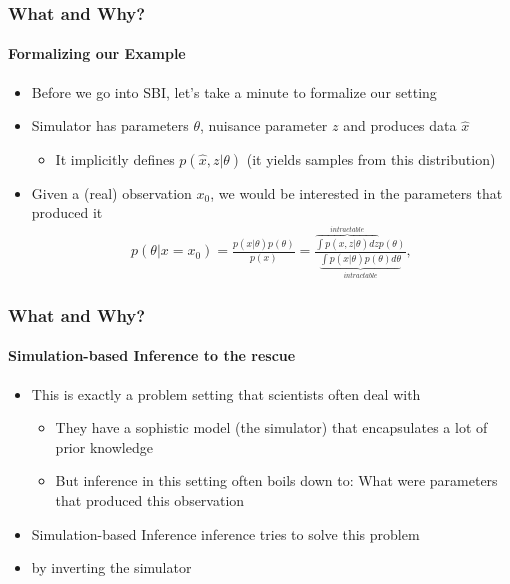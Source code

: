 \documentclass[9pt]{beamer}
\begin{document}
\begin{frame}
\frametitle{What and Why?}
\framesubtitle{Formalizing our Example}
\begin{itemize}
	\item Before we go into SBI, let's take a minute to formalize our setting
	\item Simulator has parameters $\theta$, nuisance parameter $z$ and produces data $\hat{x}$
	\begin{itemize}
		\item It implicitly defines $p(\hat{x},z|\theta)$ (it yields samples from this distribution)
	\end{itemize}
	\item Given a (real) observation $x_0$, we would be interested in the parameters that produced it
	\begin{align}
	p(\theta|x=x_0) = \frac{p(x|\theta)p(\theta)}{p(x)} = \frac{\overbrace{\int p(x,z|\theta)dz}^{intractable} p(\theta)}{\underbrace{\int p(x|\theta)p(\theta)d\theta}_{intractable}},
	\end{align}
\end{itemize}
\end{frame} 



\begin{frame}
\frametitle{What and Why?}
\framesubtitle{Simulation-based Inference to the rescue}
\begin{itemize}
		\item This is exactly a problem setting that scientists often deal with
	\begin{itemize}
		\item They have a sophistic model (the simulator) that encapsulates a lot of prior knowledge
		\item But inference in this setting often boils down to: What were parameters that produced this observation
	\end{itemize}
	\item Simulation-based Inference inference tries to solve this problem
	\item by inverting the simulator
\end{itemize}
\end{frame} 
\end{document}
